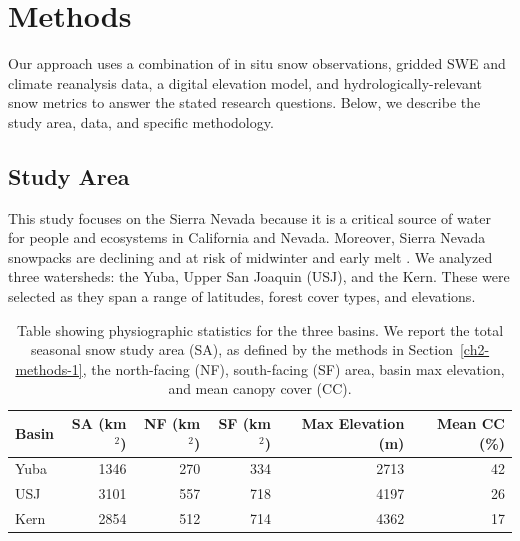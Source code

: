 \hypertarget{ch2-sa}{\section{Methods}\label{ch2-sa}}

Our approach uses a combination of in situ snow observations, gridded SWE and climate reanalysis data, a digital elevation model, and hydrologically-relevant snow metrics to answer the stated research questions. Below, we describe the study area, data, and specific methodology.

\hypertarget{ch2-sa}{\subsection{Study Area}\label{ch2-sa}}

This study focuses on the Sierra Nevada because it is a critical source of water for people and ecosystems in California and Nevada. Moreover, Sierra Nevada snowpacks are declining and at risk of midwinter and early melt \citep{harpoldDefiningSnowDrought2017}. We analyzed three watersheds: the Yuba, Upper San Joaquin (USJ), and the Kern. These were selected as they span a range of latitudes, forest cover types, and elevations.

\begin{table}[htbp]
  \centering
  \caption{Table showing physiographic statistics for the three basins. We report the total seasonal snow study area (SA), as defined by the methods in Section~\ref{ch2-methods-1}, the north-facing (NF), south-facing (SF) area, basin max elevation, and mean canopy cover (CC).}
  \label{tab:snow_metrics_val_table}
  \begin{tabular}{lrrrrr}
    \toprule
    Basin & SA (km$^{2}$) & NF (km$^{2}$) & SF (km$^{2}$) & Max Elevation (m) & Mean CC (\%) \\
    \midrule
    Yuba  & 1346 & 270 & 334 & 2713 & 42 \\
    USJ   & 3101 & 557 & 718 & 4197 & 26 \\
    Kern  & 2854 & 512 & 714 & 4362 & 17 \\
    \bottomrule
  \end{tabular}
\end{table}

